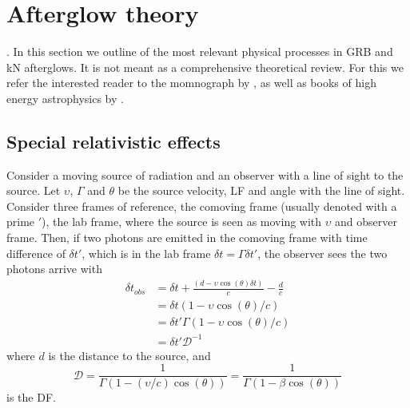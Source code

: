 %
%





\section{Afterglow theory}

.
In this section we outline of the most relevant physical processes in \ac{GRB}
and \ac{kN} afterglows. It is not meant as a comprehensive theoretical review. 
For this we refer the interested reader to the momnograph by \citet{RybickiLightman:1985}, 
as well as books of high energy astrophysics by \citet{Longair:2011,Dermer:2009}.


\subsection{Special relativistic effects}

Consider a moving source of radiation and an observer with a line of sight to the source.
Let $\upsilon$, $\Gamma$ and $\theta$ be the source velocity, 
\ac{LF} and angle with the line of sight.
%
Consider three frames of reference, the comoving frame (usually denoted with a prime $'$),
the lab frame, where the source is seen as moving with $\upsilon$ and observer frame.
Then, if two photons are emitted in the comoving frame with time difference of $\delta t'$,
which is in the lab frame $\delta t = \Gamma \delta t'$, the observer sees the two 
photons arrive with 
%
\begin{eqnarray}
\delta t_{obs} &= \delta t + \frac{(d - \upsilon\cos(\theta) \delta t)}{c} - \frac{d}{c} \\
&= \delta t (1 - \upsilon \cos(\theta) / c) \\
&= \delta t' \Gamma (1 - \upsilon \cos(\theta) / c)\\
&= \delta t' \mathcal{D}^{-1}
\end{eqnarray}
%
where $d$ is the distance to the source, and 
%
\begin{equation}
\mathcal{D} = \frac{1}{\Gamma(1 - (\upsilon/c) \cos(\theta))} = \frac{1}{\Gamma(1 - \beta\cos(\theta))}
\label{eq:afterglow:dop_fac}
\end{equation}
%
is the \ac{DF}. 


